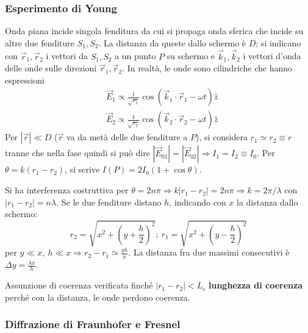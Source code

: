 \documentclass[10pt, a4paper]{scrartcl}
\numberwithin{equation}{subsection}
\theoremstyle{style1}
\begin{document}
\subsubsection{Esperimento di Young}

Onda piana incide singola fenditura da cui si propaga onda sferica che incide su altre due fenditure $S_1,S_2$. La distanza da queste dallo schermo \`e $D$; si indicano con $\vec{r}_1, \vec{r}_2$ i vettori da $S_1,S_2$ a un punto $P$ su schermo e $\vec{k}_1, \vec{k}_2$ i vettori d'onda delle onde sulle direzioni $\vec{r}_1, \vec{r}_2$. In realt\`a, le onde sono cilindriche che hanno espressioni 
\[
\begin{split}
	&\vec{E}_1 \propto \frac{1}{\sqrt{r_1} } \cos(\vec{k}_1 \cdot \vec{r}_1 - \omega t) \hat{z}\\
	& \vec{E}_2 \propto \frac{1}{\sqrt{r_2} } \cos(\vec{k}_2 \cdot \vec{r}_2 - \omega t) \hat{z}\end{split}
\] 
Per $\left\lvert \vec{r} \right\rvert \ll D  $ ($\vec{r}$ va da met\`a delle due fenditure a $P$), si considera $r_1\simeq r_2 \equiv r$ tranne che nella fase quindi si pu\`o dire $|\vec{E}_{01} | = |\vec{E}_{02} | \Rightarrow I_1=I_2\equiv I_0$. Per $\theta = k (r_1-r_2)$, si scrive $I(P) = 2 I_0 (1+\cos\theta )$. 

Si ha interferenza costruttiva per $\theta = 2n\pi \Rightarrow k \left\lvert r_1-r_2 \right\rvert = 2n \pi\Rightarrow k =2\pi / \lambda $ con $\left\lvert r_1-r_2 \right\rvert = n \lambda $. Se le due fenditure distano $h$, indicando con $x$ la distanza dallo schermo:
\[
r_2 = \sqrt{ x^2 + \left(y + \frac{h}{2}\right) ^2} ; \ r_1 = \sqrt{x^2 + \left(y - \frac{h}{2}\right) ^2} 
\] 
per $y\ll x,\ h \ll x \Rightarrow r_2-r_1 \simeq \frac{yh }{x}$. La distanza fra due massimi consecutivi \`e $\Delta  y = \frac{\lambda  x}{h}$.

Assunzione di coerenza verificata finch\'e $\left\lvert r_1-r_2 \right\rvert < L_c$ \textbf{lunghezza di coerenza} perch\'e con la distanza, le onde perdono coerenza.
\subsubsection{Diffrazione di Fraunhofer e Fresnel}
\end{document}
